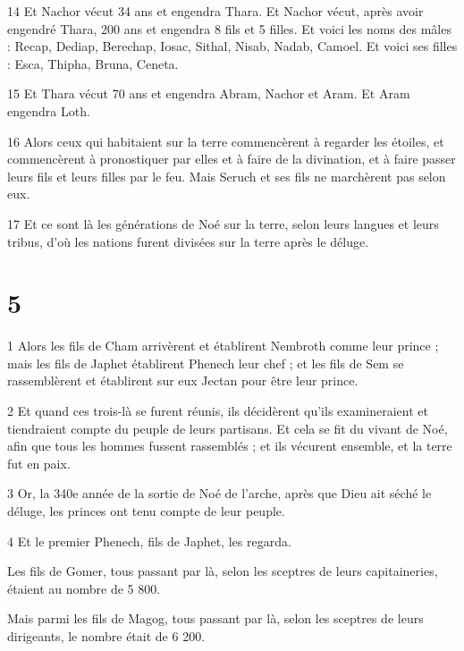 \par 14 Et Nachor vécut 34 ans et engendra Thara. Et Nachor vécut, après avoir engendré Thara, 200 ans et engendra 8 fils et 5 filles. Et voici les noms des mâles : Recap, Dediap, Berechap, Iosac, Sithal, Nisab, Nadab, Camoel. Et voici ses filles : Esca, Thipha, Bruna, Ceneta.

\par 15 Et Thara vécut 70 ans et engendra Abram, Nachor et Aram. Et Aram engendra Loth.

\par 16 Alors ceux qui habitaient sur la terre commencèrent à regarder les étoiles, et commencèrent à pronostiquer par elles et à faire de la divination, et à faire passer leurs fils et leurs filles par le feu. Mais Seruch et ses fils ne marchèrent pas selon eux.

\par 17 Et ce sont là les générations de Noé sur la terre, selon leurs langues et leurs tribus, d'où les nations furent divisées sur la terre après le déluge.

\chapter{5}

\par 1 Alors les fils de Cham arrivèrent et établirent Nembroth comme leur prince ; mais les fils de Japhet établirent Phenech leur chef ; et les fils de Sem se rassemblèrent et établirent sur eux Jectan pour être leur prince.

\par 2 Et quand ces trois-là se furent réunis, ils décidèrent qu'ils examineraient et tiendraient compte du peuple de leurs partisans. Et cela se fit du vivant de Noé, afin que tous les hommes fussent rassemblés ; et ils vécurent ensemble, et la terre fut en paix.

\par 3 Or, la 340e année de la sortie de Noé de l'arche, après que Dieu ait séché le déluge, les princes ont tenu compte de leur peuple.

\par 4 Et le premier Phenech, fils de Japhet, les regarda.

\par Les fils de Gomer, tous passant par là, selon les sceptres de leurs capitaineries, étaient au nombre de 5 800.

\par Mais parmi les fils de Magog, tous passant par là, selon les sceptres de leurs dirigeants, le nombre était de 6 200.

